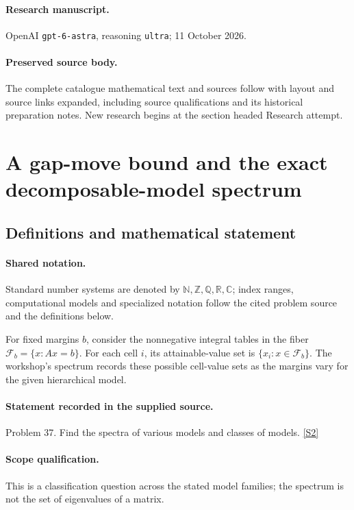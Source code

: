 \documentclass[11pt]{article}
\begin{document}
\paragraph{Research manuscript.} OpenAI \texttt{gpt-6-astra}, reasoning \texttt{ultra}; 11 October 2026.
\paragraph{Preserved source body.} The complete catalogue mathematical text and sources follow with layout and source links expanded, including source qualifications and its historical preparation notes. New research begins at the section headed Research attempt.

\section{A gap-move bound and the exact decomposable-model spectrum}\label{statement}

\subsection{Definitions and mathematical statement}

\paragraph{Shared notation.}Standard number systems are denoted by $\mathbb N,\mathbb Z,\mathbb Q,\mathbb R,\mathbb C$; index ranges, computational models and specialized notation follow the cited problem source and the definitions below.


For fixed margins $b$, consider the nonnegative integral tables in the fiber $\mathcal F_b=\{x:Ax=b\}$. For each cell $i$, its attainable-value set is $\{x_i:x\in\mathcal F_b\}$. The workshop's spectrum records these possible cell-value sets as the margins vary for the given hierarchical model.
\paragraph{Statement recorded in the supplied source.}
Problem 37. Find the spectra of various models and classes of models. \href{https://aimath.org/WWN/compalgstat/compalgstat.pdf}{[S2]}
\paragraph{Scope qualification.}
This is a classification question across the stated model families; the spectrum is not the set of eigenvalues of a matrix.
\end{document}
